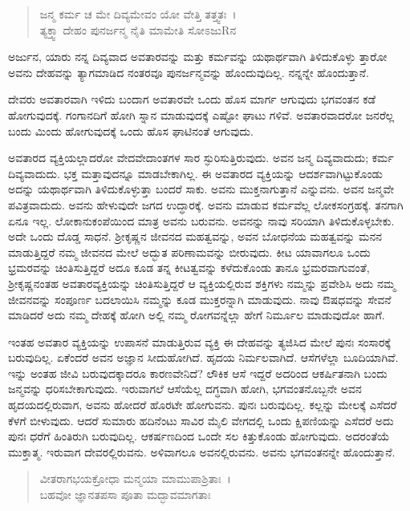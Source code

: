 \begin{verse}
ಜನ್ಮ ಕರ್ಮ ಚ ಮೇ ದಿವ್ಯಮೇವಂ ಯೋ ವೇತ್ತಿ ತತ್ತ್ವತಃ~।\\ತ್ಯಕ್ತ್ವಾ ದೇಹಂ ಪುನರ್ಜನ್ಮ ನೈತಿ ಮಾಮೇತಿ ಸೋಽಜುRನ 
\end{verse}

{\small ಅರ್ಜುನ, ಯಾರು ನನ್ನ ದಿವ್ಯವಾದ ಅವತಾರವನ್ನು ಮತ್ತು ಕರ್ಮವನ್ನು ಯಥಾರ್ಥವಾಗಿ ತಿಳಿದುಕೊಳ್ಳು ತ್ತಾರೋ ಅವನು ದೇಹವನ್ನು ತ್ಯಾಗಮಾಡಿದ ನಂತರವೂ ಪುನರ್ಜನ್ಮವನ್ನು ಹೊಂದುವುದಿಲ್ಲ. ನನ್ನನ್ನೇ ಹೊಂದುತ್ತಾನೆ.}

ದೇವರು ಅವತಾರವಾಗಿ ಇಳಿದು ಬಂದಾಗ ಅವತಾರವೇ ಒಂದು ಹೊಸ ಮಾರ್ಗ ಆಗುವುದು ಭಗವಂತನ ಕಡೆ ಹೋಗುವುದಕ್ಕೆ. ಗಂಗಾನದಿಗೆ ಹೋಗಿ ಸ್ನಾನ ಮಾಡುವುದಕ್ಕೆ ಎಷ್ಟೋ ಘಾಟು ಗಳಿವೆ. ಅವತಾರವಾದರೋ ಜನರೆಲ್ಲ ಬಂದು ಮಿಂದು ಹೋಗುವುದಕ್ಕೆ ಒಂದು ಹೊಸ ಘಾಟಿನಂತೆ ಆಗುವುದು.

ಅವತಾರದ ವ್ಯಕ್ತಿಯಲ್ಲಾದರೋ ವೇದವೇದಾಂತಗಳ ಸಾರ ಸ್ಫುರಿಸುತ್ತಿರುವುದು. ಅವನ ಜನ್ಮ ದಿವ್ಯವಾದುದು; ಕರ್ಮ ದಿವ್ಯವಾದುದು. ಭಕ್ತ ಮತ್ತಾವುದನ್ನೂ ಮಾಡಬೇಕಾಗಿಲ್ಲ. ಈ ಅವತಾರದ ವ್ಯಕ್ತಿಯನ್ನು ಆದರ್ಶವಾಗಿಟ್ಟುಕೊಂಡು ಅದನ್ನು ಯಥಾರ್ಥವಾಗಿ ತಿಳಿದುಕೊಳ್ಳುತ್ತಾ ಬಂದರೆ ಸಾಕು. ಅವನು ಮುಕ್ತನಾಗುತ್ತಾನೆ ಎನ್ನುವನು. ಅವನ ಜನ್ಮವೇ ಪವಿತ್ರವಾದುದು. ಅವನು ಹೇಳುವುದೇ ಜಗದ ಉದ್ಧಾರಕ್ಕೆ. ಅವನು ಮಾಡುವ ಕರ್ಮವೆಲ್ಲ ಲೋಕಸಂಗ್ರಹಕ್ಕೆ. ತನಗಾಗಿ ಏನೂ ಇಲ್ಲ. ಲೋಕಾನುಕಂಪೆಯಿಂದ ಮಾತ್ರ ಅವನು ಬರುವನು. ಅವನನ್ನು ನಾವು ಸರಿಯಾಗಿ ತಿಳಿದುಕೊಳ್ಳಬೇಕು. ಅದೇ ಒಂದು ದೊಡ್ಡ ಸಾಧನೆ. ಶ‍್ರೀಕೃಷ್ಣನ ಜೀವನದ ಮಹತ್ವವನ್ನು, ಅವನ ಬೋಧನೆಯ ಮಹತ್ವವನ್ನು ಮನನ ಮಾಡುತ್ತಿದ್ದರೆ ನಮ್ಮ ಜೀವನದ ಮೇಲೆ ಅದ್ಭುತ ಪರಿಣಾಮವನ್ನು ಬೀರುವುದು. ಕೀಟ ಯಾವಾಗಲೂ ಒಂದು ಭ್ರಮರವನ್ನು ಚಿಂತಿಸುತ್ತಿದ್ದರೆ ಅದೂ ಕೂಡ ತನ್ನ ಕೀಟತ್ವವನ್ನು ಕಳೆದುಕೊಂಡು ತಾನೂ ಭ್ರಮರವಾಗುವಂತೆ, ಶ‍್ರೀಕೃಷ್ಣನಂತಹ ಅವತಾರವ್ಯಕ್ತಿಯನ್ನು ಚಿಂತಿಸುತ್ತಿದ್ದರೆ ಆ ವ್ಯಕ್ತಿಯಲ್ಲಿರುವ ಶಕ್ತಿಗಳು ನಮ್ಮನ್ನು ಪ್ರವೇಶಿಸಿ ಅದು ನಮ್ಮ ಜೀವನವನ್ನು ಸಂಪೂರ್ಣ ಬದಲಾಯಿಸಿ ನಮ್ಮನ್ನು ಕೂಡ ಮುಕ್ತರನ್ನಾಗಿ ಮಾಡುವುದು. ನಾವು ಔಷಧವನ್ನು ಸೇವನೆ ಮಾಡಿದರೆ ಅದು ನಮ್ಮ ದೇಹಕ್ಕೆ ಹೋಗಿ ಅಲ್ಲಿ ನಮ್ಮ ರೋಗವನ್ನೆಲ್ಲಾ ಹೇಗೆ ನಿರ್ಮೂಲ ಮಾಡುವುದೋ ಹಾಗೆ.

ಇಂತಹ ಅವತಾರ ವ್ಯಕ್ತಿಯನ್ನು ಉಪಾಸನೆ ಮಾಡುತ್ತಿರುವ ವ್ಯಕ್ತಿ ಈ ದೇಹವನ್ನು ತ್ಯಜಿಸಿದ ಮೇಲೆ ಪುನಃ ಸಂಸಾರಕ್ಕೆ ಬರುವುದಿಲ್ಲ. ಏಕೆಂದರೆ ಅವನ ಅಜ್ಞಾನ ಸೀದುಹೋಗಿದೆ. ಹೃದಯ ನಿರ್ಮಲವಾಗಿದೆ. ಆಸೆಗಳೆಲ್ಲಾ ಬೂದಿಯಾಗಿವೆ. ಇನ್ನು ಅಂತಹ ಜೀವಿ ಬರುವುದಕ್ಕಾದರೂ ಕಾರಣವೇನಿದೆ? ಲೌಕಿಕ ಆಸೆ ಇದ್ದರೆ ಅದರಿಂದ ಆಕರ್ಷಿತನಾಗಿ ಬಂದು ಜನ್ಮವನ್ನು ಧರಿಸಬೇಕಾಗುವುದು. ಇರುವಾಗಲೆ ಆಸೆಯೆಲ್ಲ ದಗ್ಧವಾಗಿ ಹೋಗಿ, ಭಗವಂತನೊಬ್ಬನೇ ಅವನ ಹೃದಯದಲ್ಲಿರುವಾಗ, ಅವನು ಹೋದರೆ ಹೊರಟೇ ಹೋಗುವನು. ಪುನಃ ಬರುವುದಿಲ್ಲ. ಕಲ್ಲನ್ನು ಮೇಲಕ್ಕೆ ಎಸೆದರೆ ಕೆಳಗೆ ಬೀಳುವುದು. ಆದರೆ ಸುಮಾರು ಹದಿನೆಂಟು ಸಾವಿರ ಮೈಲಿ ವೇಗದಲ್ಲಿ ಒಂದು ಕ್ಷಿಪಣಿಯನ್ನು ಎಸೆದರೆ ಅದು ಪುನಃ ಧರೆಗೆ ಹಿಂತಿರುಗಿ ಬರುವುದಿಲ್ಲ. ಆಕರ್ಷಣದಿಂದ ಒಂದೇ ಸಲ ಕಿತ್ತುಕೊಂಡು ಹೋಗುವುದು. ಅದರಂತೆಯೆ ಮುಕ್ತಾತ್ಮ. ಇರುವಾಗ ದೇವರಲ್ಲಿರುವನು. ಅಳಿವಾಗಲೂ ಅವನಲ್ಲಿರುವನು. ಅವನು ಭಗವಂತನನ್ನೇ ಹೊಂದುತ್ತಾನೆ.

\begin{verse}
ವೀತರಾಗಭಯಕ್ರೋಧಾ ಮನ್ಮಯಾ ಮಾಮುಪಾಶ್ರಿತಾಃ~।\\ಬಹವೋ ಜ್ಞಾನತಪಸಾ ಪೂತಾ ಮದ್ಭಾವಮಾಗತಾಃ 
\end{verse}

